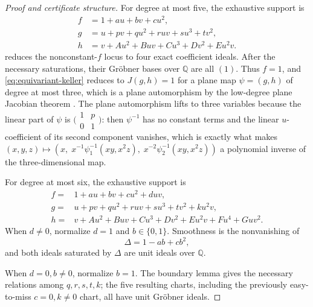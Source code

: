 \begin{proof}[Proof and certificate structure]
For degree at most five, the exhaustive support is
\[
\begin{aligned}
f&=1+au+bv+cu^2,\\
g&=u+pv+qu^2+ruv+su^3+tv^2,\\
h&=v+Au^2+Buv+Cu^3+Dv^2+Eu^2v.
\end{aligned}
\]
 reduces the nonconstant-\(f\) locus to four
exact coefficient ideals.  After the necessary saturations, their
Gr\"obner bases over \(\mathbb Q\) are all \((1)\).  Thus \(f=1\), and
\eqref{eq:equivariant-keller} reduces to \(J(g,h)=1\) for a plane map
\(\psi=(g,h)\) of degree at most three, which is a plane automorphism by
the low-degree plane Jacobian theorem
\cite{appelgateOnishi1985,nagata1988two}.  The
plane automorphism lifts to three variables because the linear part of
\(\psi\) is \(\bigl(\begin{smallmatrix}1&p\\0&1\end{smallmatrix}\bigr)\):
then \(\psi^{-1}\) has no constant terms and the linear \(u\)-coefficient
of its second component vanishes, which is exactly what makes
\((x,y,z)\mapsto
(x,\;x^{-1}\psi^{-1}_1(xy,x^2z),\;x^{-2}\psi^{-1}_2(xy,x^2z))\)
a polynomial inverse of the three-dimensional map.

For degree at most six, the exhaustive support is
\[
\begin{aligned}
f={}&1+au+bv+cu^2+duv,\\
g={}&u+pv+qu^2+ruv+su^3+tv^2+ku^2v,\\
h={}&v+Au^2+Buv+Cu^3+Dv^2+Eu^2v+Fu^4+Guv^2.
\end{aligned}
\]
When \(d\ne0\), normalize \(d=1\) and \(b\in\{0,1\}\).  Smoothness is the
nonvanishing of
\[
\Delta=1-ab+cb^2,
\]
and both ideals saturated by \(\Delta\) are unit ideals over
\(\mathbb Q\).

When \(d=0,b\ne0\), normalize \(b=1\).  The boundary lemma gives the
necessary relations among \(q,r,s,t,k\); the five resulting charts,
including the previously easy-to-miss \(c=0,k\ne0\) chart, all have unit
Gr\"obner ideals.


\end{proof}
